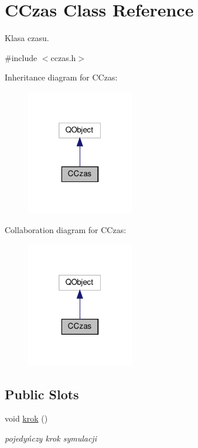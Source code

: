 \hypertarget{class_c_czas}{}\section{C\+Czas Class Reference}
\label{class_c_czas}


Klasa czasu.  




{\ttfamily \#include $<$cczas.\+h$>$}



Inheritance diagram for C\+Czas\+:\nopagebreak
\begin{figure}[H]
\begin{center}
\leavevmode
\includegraphics[width=133pt]{class_c_czas__inherit__graph}
\end{center}
\end{figure}


Collaboration diagram for C\+Czas\+:\nopagebreak
\begin{figure}[H]
\begin{center}
\leavevmode
\includegraphics[width=133pt]{class_c_czas__coll__graph}
\end{center}
\end{figure}
\subsection*{Public Slots}
\begin{DoxyCompactItemize}
\item 
void \mbox{\hyperlink{class_c_czas_af0d9dec535471fd48fee05101ebc6357}{krok}} ()
\begin{DoxyCompactList}\small\item\em pojedyńczy krok symulacji \end{DoxyCompactList}\end{DoxyCompactItemize}
